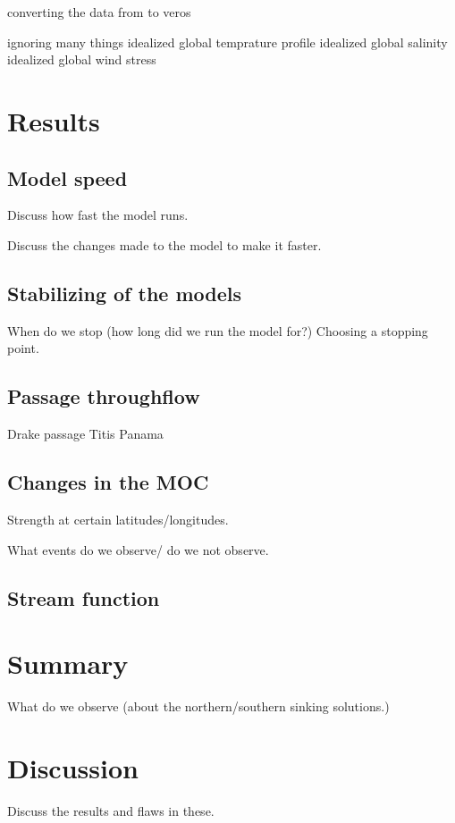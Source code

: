 \documentclass[a4paper]{article}
\begin{document}
\begin{multicols}{2}
converting the data from \cite{Muller2008Mar} to veros

ignoring many things
idealized global temprature profile
idealized global salinity
idealized global wind stress


\section{Results}

\subsection{Model speed}

Discuss how fast the model runs.

Discuss the changes made to the model to make it faster.


\subsection{Stabilizing of the models}
When do we stop (how long did we run the model for?)
Choosing a stopping point.


\subsection{Passage throughflow}

Drake passage
Titis
Panama

\subsection{Changes in the MOC}

Strength at certain latitudes/longitudes.

What events do we observe/ do we not observe.

\subsection{Stream function}



\section{Summary}

What do we observe (about the northern/southern sinking solutions.)


\section{Discussion}
Discuss the results and flaws in these.


\end{multicols}
\end{document}
